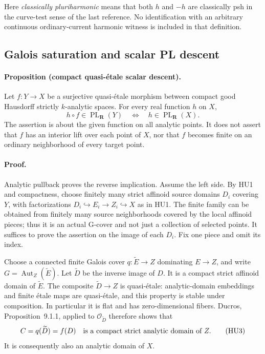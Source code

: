 Here \emph{classically pluriharmonic} means that both $h$ and $-h$
are classically psh in the curve-test sense of the last reference.
No identification with an arbitrary continuous ordinary-current
harmonic witness is included in that definition.

\subsection{Galois saturation and scalar PL descent}

\paragraph{Proposition (compact quasi-\'etale scalar descent).}
Let $f:Y\to X$ be a surjective quasi-\'etale morphism between compact
good Hausdorff strictly $k$-analytic spaces.  For every real function
$h$ on $X$,
\[
 h\circ f\in\operatorname{PL}_{\mathbf R}(Y)
 \quad\Longleftrightarrow\quad
 h\in\operatorname{PL}_{\mathbf R}(X).                   \tag{HU2}
\]
The assertion is about the given function on all analytic points.
It does not assert that $f$ has an interior lift over each point of
$X$, nor that $f$ becomes finite on an ordinary neighborhood of
every target point.

\paragraph{Proof.}
Analytic pullback proves the reverse implication.  Assume the left
side.  By HU1 and compactness, choose finitely many strict affinoid
source domains $D_i$ covering $Y$, with factorizations
$D_i\hookrightarrow E_i\to Z_i\hookrightarrow X$ as in HU1.
The finite family can be obtained from finitely many source
neighborhoods covered by the local affinoid pieces; thus it is an
actual G-cover and not just a collection of selected points.
It suffices to prove the assertion on the image of each $D_i$.
Fix one piece and omit its index.

Choose a connected finite Galois cover $q:\widetilde E\to Z$
dominating $E\to Z$, and write $G=\operatorname{Aut}_Z(\widetilde E)$.
Let $\widetilde D$ be the inverse image of $D$.  It is a compact
strict affinoid domain of $\widetilde E$.  The composite
$\widetilde D\to Z$ is quasi-\'etale: analytic-domain embeddings and
finite \'etale maps are quasi-\'etale, and this property is stable
under composition.  In particular it is flat and has
zero-dimensional fibers.  Ducros, Proposition~9.1.1, applied to
$\mathcal O_{\widetilde D}$ therefore shows that
\[
 C=q(\widetilde D)=f(D)
 \quad\hbox{is a compact strict analytic domain of }Z.    \tag{HU3}
\]
It is consequently also an analytic domain of $X$.


